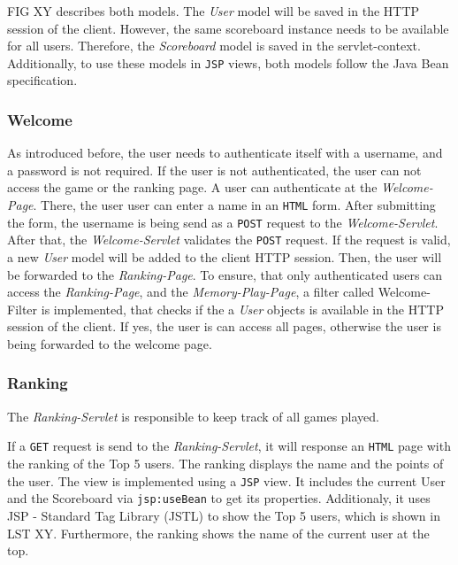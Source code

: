 FIG XY describes both models. The \textit{User} model will be saved in the HTTP session of the client. However, the same scoreboard instance needs to be available for all users. Therefore, the \textit{Scoreboard} model is saved in the servlet-context.
Additionally, to use these models in \texttt{JSP} views, both models follow the Java Bean specification.

\subsubsection{Welcome}\label{subsubsec:03_impl_backend_welcome}
As introduced before, the user needs to authenticate itself with a username, and a password is not required. If the user is not authenticated, the user can not access the game or the ranking page.
A user can authenticate at the \textit{Welcome-Page}. There, the user user can enter a name in an \texttt{HTML} form. After submitting the form, the username is being send as a \texttt{POST} request to the \textit{Welcome-Servlet}. After that, the \textit{Welcome-Servlet} validates the \texttt{POST} request. If the request is valid, a new \textit{User} model will be added to the client HTTP session. Then, the user will be forwarded to the \textit{Ranking-Page}.
To ensure, that only authenticated users can access the \textit{Ranking-Page}, and the \textit{Memory-Play-Page}, a filter called Welcome-Filter is implemented, that checks if the a \textit{User} objects is available in the HTTP session of the client. If yes, the user is can access all pages, otherwise the user is being forwarded to the welcome page.

\subsubsection{Ranking}\label{subsubsec:03_impl_backend_ranking}
The \textit{Ranking-Servlet} is responsible to keep track of all games played.

If a \texttt{GET} request is send to the \textit{Ranking-Servlet}, it will response an \texttt{HTML} page with the ranking of the Top 5 users. The ranking displays the name and the points of the user.
The view is implemented using a \texttt{JSP} view. It includes the current User and the Scoreboard via \texttt{jsp:useBean} to get its properties.
Additionaly, it uses JSP - Standard Tag Library (JSTL) to show the Top 5 users, which is shown in LST XY. Furthermore, the ranking shows the name of the current user at the top.


